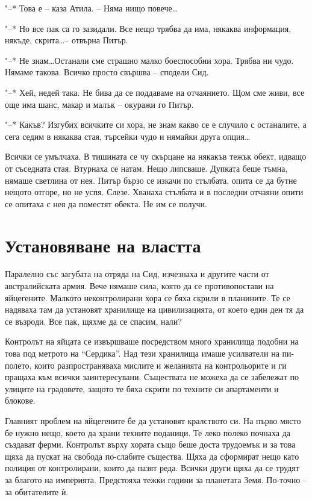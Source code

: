 \documentclass[ebook,openany,12pt]{memoir}
\begin{document}
"--* Това е – каза Атила. – Няма нищо повече\ldots

"--* Но все пак са го зазидали. Все нещо трябва да има, някаква информация, някъде, скрита\ldots -- отвърна Питър.

"--* Не знам\ldots Останали сме страшно малко боеспособни хора. Трябва ни чудо. Нямаме такова. Всичко просто свършва – сподели Сид.

"--* Хей, недей така. Не бива да се поддаваме на отчаянието. Щом сме живи, все още има шанс, макар и малък – окуражи го Питър.

"--* Какъв? Изгубих всичките си хора, не знам какво се е случило с останалите, а сега седим в някаква стая, търсейки чудо и нямайки друга опция\ldots

Всички се умълчаха. В тишината се чу скърцане на някакъв тежък обект, идващо от съседната стая. Втурнаха се натам. Нещо липсваше. Дупката беше тъмна, нямаше светлина от нея. Питър бързо се изкачи по стълбата, опита се да бутне нещото отгоре, но не успя. Слезе. Хванаха стълбата и в последни отчаяни опити се опитаха с нея да поместят обекта. Не им се получи.

\chapter{Установяване на властта}

Паралелно със загубата на отряда на Сид, изчезнаха и другите части от австралийската армия. Вече нямаше сила, която да се противопостави на яйцегените. Малкото неконтролирани хора се бяха скрили в планините. Те се надяваха там да установят хранилище на цивилизацията, от което един ден тя да се възроди. Все пак, щяхме да се спасим, нали?

Контролът на яйцата се извършваше посредством много хранилища подобни на това под метрото на ``Сердика''. Над тези хранилища имаше усилватели на пи-полето, които разпространяваха мислите и желанията на контрольорите и ги пращаха към всички заинтересувани. Съществата не можеха да се забележат по улиците на градовете, защото те бяха скрити по техните си апартаменти и блокове.

Главният проблем на яйцегените бе да установят кр\-алството си. На първо място бе нужно нещо, което да храни техните поданици. Те леко полеко почнаха да създават ферми. Контролът върху хората също беше доста трудоемък и за това щяха да пускат на свобода по-слабите същества. Щяха да сформират нещо като полиция от контролирани, които да пазят реда. Всички други щяха да се трудят за благото на империята. Предстояха тежки години за планетата Земя. По-точно – за обитателите ѝ.
\end{document}
